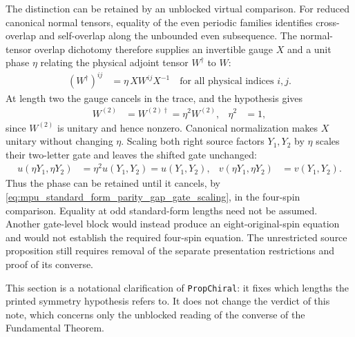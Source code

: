 \documentclass{article}
\begin{document}
The distinction can be retained by an unblocked virtual comparison. For
reduced canonical normal tensors, equality of the even periodic families
identifies cross-overlap and self-overlap along the unbounded even
subsequence. The normal-tensor overlap dichotomy therefore supplies an
invertible gauge $X$ and a unit phase $\eta$ relating the physical adjoint
tensor $W^\dagger$ to $W$:
\begin{align}
    (W^\dagger)^{ij} & =\eta\,XW^{ij}X^{-1}\quad\text{for all physical indices }i,j.
    \label{eq:mpu_standard_form_parity_gap_virtual_sign}
\end{align}
At length two the gauge cancels in the trace, and the hypothesis gives
\begin{align}
    W^{(2)} & =W^{(2)\dagger}=\eta^2W^{(2)}, &
    \eta^2  & =1,
    \label{eq:mpu_standard_form_parity_gap_sign_square}
\end{align}
since $W^{(2)}$ is unitary and hence nonzero.
Canonical normalization makes $X$ unitary without changing $\eta$. Scaling
both right source factors $Y_1,Y_2$ by $\eta$ scales their two-letter gate
and leaves the shifted gate unchanged:
\begin{align}
    u(\eta Y_1,\eta Y_2) & =\eta^2u(Y_1,Y_2)=u(Y_1,Y_2), &
    v(\eta Y_1,\eta Y_2) & =v(Y_1,Y_2).
    \label{eq:mpu_standard_form_parity_gap_gate_scaling}
\end{align}
Thus the phase can be retained until it cancels, by
\eqref{eq:mpu_standard_form_parity_gap_gate_scaling}, in the four-spin
comparison. Equality at odd standard-form lengths need not be
assumed. Another gate-level block would instead produce an eight-original-spin
equation and would not establish the required four-spin equation.
The unrestricted source proposition still requires removal of the separate
presentation restrictions and proof of its converse.

This section is a notational clarification of \texttt{PropChiral}: it fixes
which lengths the printed symmetry hypothesis refers to. It does not change
the verdict of this note, which concerns only the unblocked reading of the
converse of the Fundamental Theorem.



\end{document}
